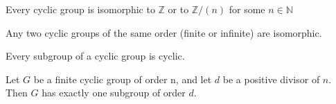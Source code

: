 \begin{teo}
Every cyclic group is isomorphic to $\mathbb Z$ or to $\mathbb Z/(n)$ for some $n\in \mathbb N$
\end{teo}
\begin{teo}
    Any two cyclic groups of the same order (finite or infinite) are isomorphic.
\end{teo} 
\begin{teo}
    Every subgroup of a cyclic group is cyclic.
\end{teo}
\begin{teo}
    Let $G$ be a finite cyclic group of order n, and let $d$ be a positive divisor of $n$. Then $G$ has exactly one subgroup of order $d$.
\end{teo}